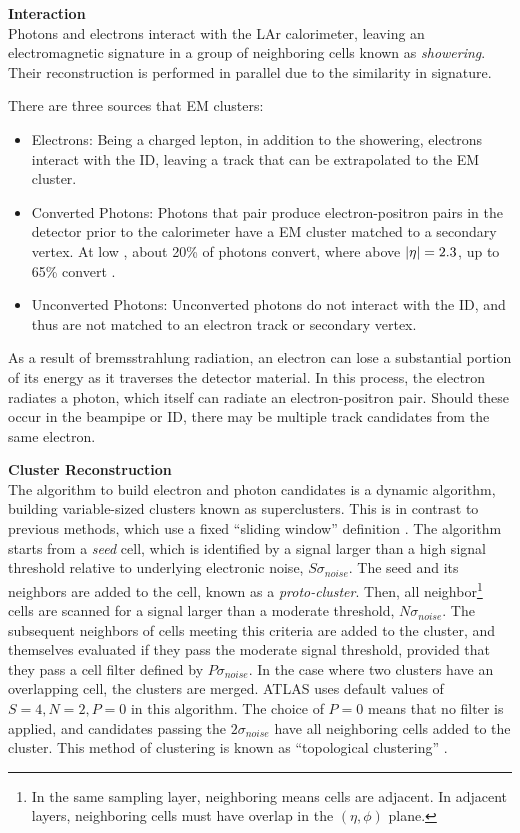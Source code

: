 \noindent\textbf{Interaction}\\
\indent Photons and electrons interact with the \gls{LAr} calorimeter, leaving an electromagnetic signature in a group of neighboring cells known as \textit{showering}. Their reconstruction is performed in parallel due to the similarity in signature.

There are three sources that \gls{EM} clusters:
\begin{itemize}
    \item Electrons: Being a charged lepton, in addition to the showering, electrons interact with the \gls{ID}, leaving a track that can be extrapolated to the \gls{EM} cluster.
    \item Converted Photons: Photons that pair produce electron-positron pairs in the detector prior to the calorimeter have a \gls{EM} cluster matched to a secondary vertex. At low \abseta, about 20\% of photons convert, where above $|\eta|=2.3$, up to 65\% convert \cite{photon-electron-perf}.
    \item Unconverted Photons: Unconverted photons do not interact with the \gls{ID}, and thus are not matched to an electron track or secondary vertex.
\end{itemize}

As a result of bremsstrahlung radiation, an electron can lose a substantial portion of its energy as it traverses the detector material. In this process, the electron radiates a photon, which itself can radiate an electron-positron pair. Should these occur in the beampipe or \gls{ID}, there may be multiple track candidates from the same electron.


\noindent\textbf{Cluster Reconstruction}\\
\indent The algorithm to build electron and photon candidates is a dynamic algorithm, building variable-sized clusters known as superclusters. This is in contrast to previous methods, which use a fixed ``sliding window'' definition \cite{sliding-window}. The algorithm starts from a \textit{seed} cell, which is identified by a signal larger than a high signal threshold relative to underlying electronic noise, $S\sigma_{noise}$. The seed and its neighbors are added to the cell, known as a \textit{proto-cluster}. Then, all neighbor\footnote{In the same sampling layer, neighboring means cells are adjacent. In adjacent layers, neighboring cells must have overlap in the $(\eta,\phi)$ plane.} cells are scanned for a signal larger than a moderate threshold, $N\sigma_{noise}$. The subsequent neighbors of cells meeting this criteria are added to the cluster, and themselves evaluated if they pass the moderate signal threshold, provided that they pass a cell filter defined by $P\sigma_{noise}$. In the case where two clusters have an overlapping cell, the clusters are merged. ATLAS uses default values of $S=4,N=2,P=0$ in this algorithm. The choice of $P=0$ means that no filter is applied, and candidates passing the $2\sigma_{noise}$ have all neighboring cells added to the cluster. This method of clustering is known as  ``topological clustering'' \cite{topo-cluster}. 


